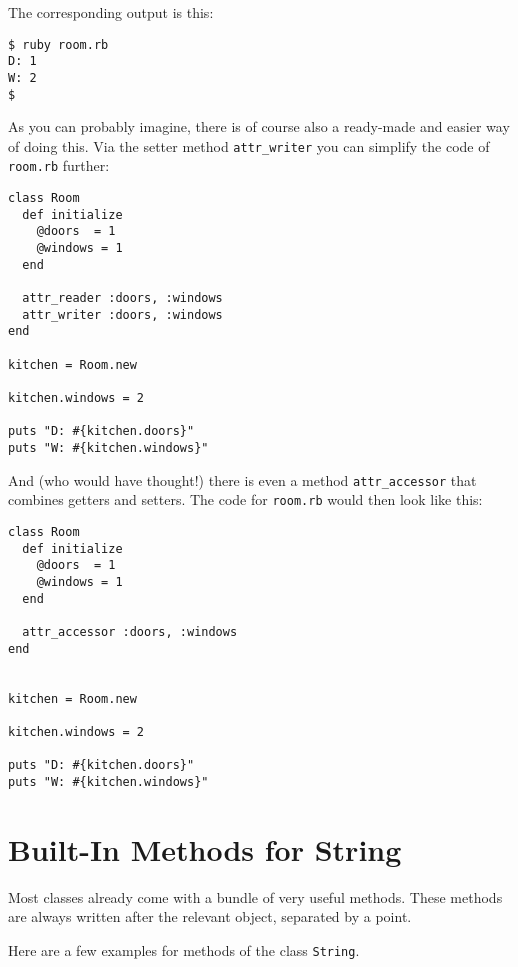 \documentclass[a4paper]{book}
\begin{document}
The corresponding output is this:

\begin{shaded}\begin{verbatim}
$ ruby room.rb
D: 1
W: 2
$
\end{verbatim}\end{shaded}

As you can probably imagine, there is of course also a ready-made and easier way of doing this. Via the setter method \texttt{attr\_writer} you can simplify the code of \texttt{room.rb} further:

\begin{shaded}\begin{verbatim}
class Room
  def initialize
    @doors  = 1
    @windows = 1
  end

  attr_reader :doors, :windows
  attr_writer :doors, :windows
end

kitchen = Room.new

kitchen.windows = 2

puts "D: #{kitchen.doors}"
puts "W: #{kitchen.windows}"
\end{verbatim}\end{shaded}

And (who would have thought!) there is even a method \texttt{attr\_accessor} that combines getters and setters. The code for \texttt{room.rb} would then look like this:

\begin{shaded}\begin{verbatim}
class Room
  def initialize
    @doors  = 1
    @windows = 1
  end

  attr_accessor :doors, :windows
end


kitchen = Room.new

kitchen.windows = 2

puts "D: #{kitchen.doors}"
puts "W: #{kitchen.windows}"
\end{verbatim}\end{shaded}

\section{Built-In Methods for String}\label{built-in-methods-for-string}

Most classes already come with a bundle of very useful methods. These methods are always written after the relevant object, separated by a point.

Here are a few examples for methods of the class \texttt{String}.
\end{document}
